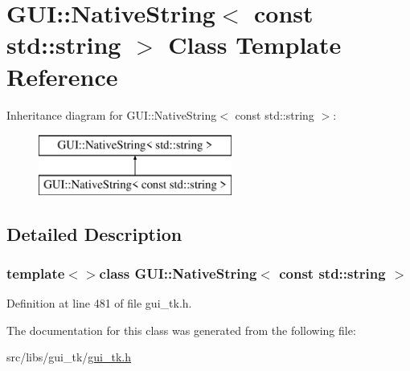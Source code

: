 \hypertarget{classGUI_1_1NativeString_3_01const_01std_1_1string_01_4}{\section{G\-U\-I\-:\-:Native\-String$<$ const std\-:\-:string $>$ Class Template Reference}
\label{classGUI_1_1NativeString_3_01const_01std_1_1string_01_4}
}
Inheritance diagram for G\-U\-I\-:\-:Native\-String$<$ const std\-:\-:string $>$\-:\begin{figure}[H]
\begin{center}
\leavevmode
\includegraphics[height=2.000000cm]{classGUI_1_1NativeString_3_01const_01std_1_1string_01_4}
\end{center}
\end{figure}


\subsection{Detailed Description}
\subsubsection*{template$<$$>$class G\-U\-I\-::\-Native\-String$<$ const std\-::string $>$}



Definition at line 481 of file gui\-\_\-tk.\-h.



The documentation for this class was generated from the following file\-:\begin{DoxyCompactItemize}
\item 
src/libs/gui\-\_\-tk/\hyperlink{gui__tk_8h}{gui\-\_\-tk.\-h}\end{DoxyCompactItemize}
